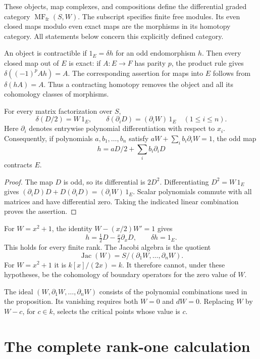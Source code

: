 These objects, map complexes, and compositions define the
differential graded category \(\operatorname{MF}_{\mathrm{fr}}(S,W)\).
The subscript specifies finite free modules. Its even closed maps
modulo even exact maps are the morphisms in its homotopy category.
All statements below concern this explicitly defined category.

An object is contractible if \(1_E=\delta h\) for an odd endomorphism
\(h\). Then every closed map out of \(E\) is exact: if \(A:E\to F\)
has parity \(p\), the product rule gives
\(\delta((-1)^pAh)=A\). The corresponding assertion for maps into
\(E\) follows from \(\delta(hA)=A\). Thus a contracting homotopy removes
the object and all its cohomology classes of morphisms.

\begin{proposition}
\label{prop:pb-potential-primitives}
For every matrix factorization over \(S\),
\[
 \delta(D/2)=W\,1_E,\qquad
 \delta(\partial_iD)=(\partial_iW)\,1_E
 \quad(1\leq i\leq n).
\]
Here \(\partial_i\) denotes entrywise polynomial differentiation with
respect to \(x_i\). Consequently, if polynomials \(a,b_1,\ldots,b_n\)
satisfy \(aW+\sum_i b_i\partial_iW=1\), the odd map
\[
 h=aD/2+\sum_i b_i\partial_iD
\]
contracts \(E\).
\end{proposition}
\begin{proof}
The map \(D\) is odd, so its differential is \(2D^2\).
Differentiating \(D^2=W\,1_E\) gives
\((\partial_iD)D+D(\partial_iD)=(\partial_iW)\,1_E\).
Scalar polynomials commute with all matrices and have differential
zero. Taking the indicated linear combination proves the assertion.
\end{proof}

For \(W=x^2+1\), the identity \(W-(x/2)W'=1\) gives
\[
 h=\tfrac12D-\tfrac{x}{2}\partial_xD,\qquad \delta h=1_E.
\]
This holds for every finite rank. The Jacobi algebra is the quotient
\[
 \operatorname{Jac}(W)=S/(\partial_1W,\ldots,\partial_nW).
\]
For \(W=x^2+1\) it is \(k[x]/(2x)=k\).
It therefore cannot, under these hypotheses,
be the cohomology of boundary operators for the zero value of \(W\).

The ideal \((W,\partial_1W,\ldots,\partial_nW)\) consists of the
polynomial combinations used in the proposition. Its vanishing
requires both \(W=0\) and \(dW=0\). Replacing \(W\) by \(W-c\), for
\(c\in k\), selects the critical points whose value is \(c\).

\section{The complete rank-one calculation}
\label{sec:pb-rank-one}

